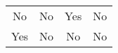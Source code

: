 \begin{tabular}{cccc}
  No & No & \cellcolor{lightgray}Yes & No \\
  \cellcolor{lightgray}Yes & No & No & No \\
\end{tabular}
